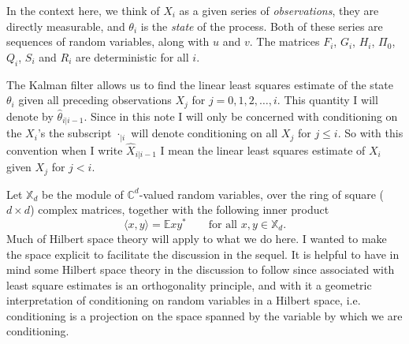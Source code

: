 \documentclass[12pt]{amsart}
\newcommand{\E}{\mathbb{E}}
\newcommand{\C}{\mathbb{C}}
\begin{document}
In the context here, we think of $X_i$ as a given series of\textit{ observations}, they are directly measurable, and $\theta_i$ is the \textit{state} of the process. Both of these series are sequences of random variables, along with $u$ and $v$. The matrices $F_i$, $G_i$, $H_i$, $\Pi_0$, $Q_i$, $S_i$ and $R_i$ are deterministic for all $i$. 

The Kalman filter allows us to find the linear least squares estimate of the state $\theta_i$ given all preceding observations $X_j$ for $j = 0,1,2,\dots, i$. 
This quantity I will denote by $\hat{\theta}_{i|i-1}$. Since in this note I will only be concerned with conditioning on the $X_i$'s the subscript $\cdot_{|i}$ will denote conditioning on all $X_j$ for $j \le i$. 
So with this convention when I write $\hat{X}_{i|i-1}$ I mean the linear least squares estimate of $X_i$ given $X_j$ for $j < i$. 

Let $\mathbb{X}_d$ be the module of $\C^d$-valued random variables, over the ring of square ($d\times d$) complex matrices, together with the following inner product
$$\langle x,y \rangle = \E xy^*\qquad \text{for all }x,y\in \mathbb{X}_d.$$ Much of Hilbert space theory will apply to what we do here. I wanted to make the space explicit to facilitate the discussion in the sequel. It is helpful to have in mind some Hilbert space theory in the discussion to follow since associated with least square estimates is an orthogonality principle, and with it a geometric interpretation of conditioning on random variables in a Hilbert space, i.e. conditioning is a projection on the space spanned by the variable by which we are conditioning. 
\end{document}

